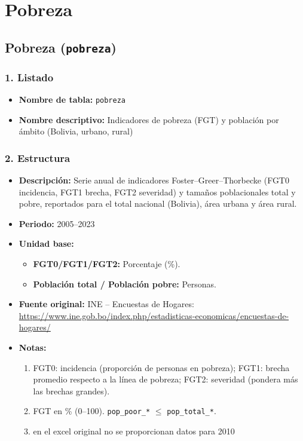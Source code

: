 \documentclass[12pt,a4paper]{article}
\begin{document}
\newpage
\section{Pobreza}
\subsection{Pobreza \small(\texttt{pobreza})}

\subsubsection*{1. Listado}
\begin{itemize}
  \item \textbf{Nombre de tabla:} \texttt{pobreza}
  \item \textbf{Nombre descriptivo:} Indicadores de pobreza (FGT) y población por ámbito (Bolivia, urbano, rural)
\end{itemize}

\subsubsection*{2. Estructura}
\begin{itemize}
  \item \textbf{Descripción:} Serie anual de indicadores Foster–Greer–Thorbecke (FGT0 incidencia, FGT1 brecha, FGT2 severidad) y tamaños poblacionales total y pobre, reportados para el total nacional (Bolivia), área urbana y área rural.
  \item \textbf{Periodo:} 2005--2023
  \item \textbf{Unidad base:} 
    \begin{itemize}
      \item \textbf{FGT0/FGT1/FGT2:} Porcentaje (\%).
      \item \textbf{Población total / Población pobre:} Personas.
    \end{itemize}
  \item \textbf{Fuente original:} INE – Encuestas de Hogares: \url{https://www.ine.gob.bo/index.php/estadisticas-economicas/encuestas-de-hogares/}
  \item \textbf{Notas:}
    \begin{enumerate}
      \item FGT0: incidencia (proporción de personas en pobreza); FGT1: brecha promedio respecto a la línea de pobreza; FGT2: severidad (pondera más las brechas grandes).
      \item FGT en \% (0–100). \texttt{pop\_poor\_*} $\leq$ \texttt{pop\_total\_*}.
        \item en el excel original no se proporcionan datos para 2010
    \end{enumerate}
\end{itemize}
\end{document}
